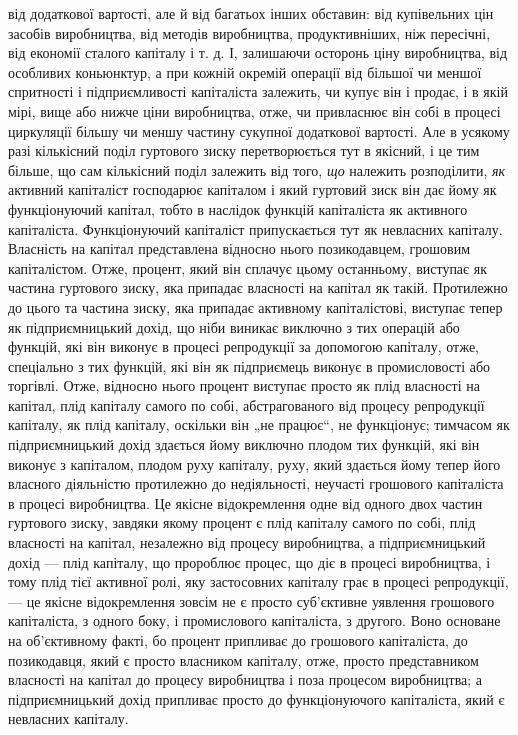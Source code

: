 \parcont{}  %
від додаткової вартості, але й від багатьох інших обставин: від
купівельних цін засобів виробництва, від методів виробництва,
продуктивніших, ніж пересічні, від економії сталого капіталу
і т. д. І, залишаючи осторонь ціну виробництва, від особливих
коньюнктур, а при кожній окремій операції від більшої чи меншої
спритності і підприємливості капіталіста залежить, чи купує
він і продає, і в якій мірі, вище або нижче ціни виробництва,
отже, чи привласнює він собі в процесі циркуляції більшу чи
меншу частину сукупної додаткової вартості. Але в усякому разі
кількісний поділ гуртового зиску перетворюється тут в якісний,
і це тим більше, що сам кількісний поділ залежить від того, \emph{що}
належить розподілити, \emph{як} активний капіталіст господарює капіталом
і який гуртовий зиск він дає йому як функціонуючий капітал,
тобто в наслідок функцій капіталіста як активного капіталіста.
Функціонуючий капіталіст припускається тут як невласних капіталу.
Власність на капітал представлена відносно нього позикодавцем,
грошовим капіталістом. Отже, процент, який він
сплачує цьому останньому, виступає як частина гуртового зиску,
яка припадає власності на капітал як такій. Протилежно до
цього та частина зиску, яка припадає активному капіталістові,
виступає тепер як підприємницький дохід, що ніби виникає виключно
з тих операцій або функцій, які він виконує в процесі
репродукції за допомогою капіталу, отже, спеціально з тих функцій,
які він як підприємець виконує в промисловості або торгівлі.
Отже, відносно нього процент виступає просто як плід власності
на капітал, плід капіталу самого по собі, абстрагованого від процесу
репродукції капіталу, як плід капіталу, оскільки він „не працює“,
не функціонує; тимчасом як підприємницький дохід здається
йому виключно плодом тих функцій, які він виконує з капіталом,
плодом руху капіталу, руху, який здається йому тепер його
власного діяльністю протилежно до недіяльності, неучасті грошового
капіталіста в процесі виробництва. Це якісне відокремлення
одне від одного двох частин гуртового зиску, завдяки якому
процент є плід капіталу самого по собі, плід власності на капітал,
незалежно від процесу виробництва, а підприємницький
дохід — плід капіталу, що пророблює процес, що діє в процесі
виробництва, і тому плід тієї активної ролі, яку застосовних
капіталу грає в процесі репродукції, — це якісне відокремлення
зовсім не є просто суб’єктивне уявлення грошового капіталіста,
з одного боку, і промислового капіталіста, з другого. Воно
основане на об’єктивному факті, бо процент припливає до грошового
капіталіста, до позикодавця, який є просто власником
капіталу, отже, просто представником власності на капітал до
процесу виробництва і поза процесом виробництва; а підприємницький
дохід припливає просто до функціонуючого капіталіста,
який є невласних капіталу.

